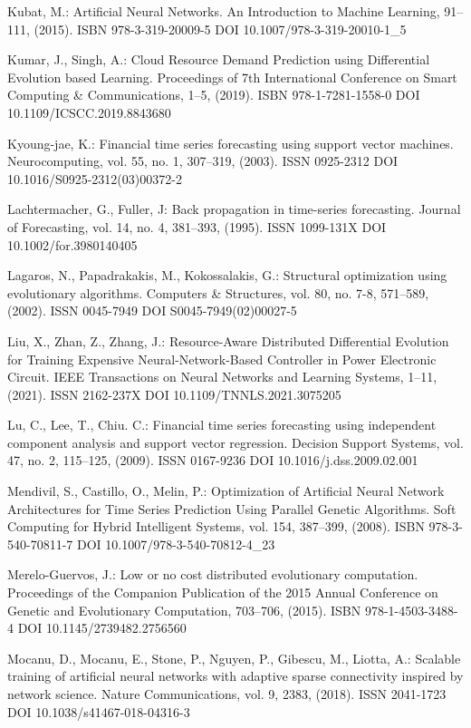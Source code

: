 \begin{thebibliography}{99.}
 Kubat, M.: Artificial Neural Networks. An Introduction to Machine Learning, 91--111, (2015). ISBN 978-3-319-20009-5 DOI 10.1007/978-3-319-20010-1\_5

 Kumar, J., Singh, A.: Cloud Resource Demand Prediction using Differential Evolution based Learning. Proceedings of 7th International Conference on Smart Computing \& Communications, 1--5, (2019). ISBN 978-1-7281-1558-0 DOI 10.1109/ICSCC.2019.8843680

 Kyoung-jae, K.: Financial time series forecasting using support vector machines. Neurocomputing, vol. 55, no. 1, 307--319, (2003). ISSN 0925-2312 DOI 10.1016/S0925-2312(03)00372-2

 Lachtermacher, G., Fuller, J: Back propagation in time-series forecasting. Journal of Forecasting, vol. 14, no. 4, 381--393, (1995). ISSN 1099-131X DOI 10.1002/for.3980140405

 Lagaros, N., Papadrakakis, M., Kokossalakis, G.: Structural optimization using evolutionary algorithms. Computers \& Structures, vol. 80, no. 7-8, 571--589, (2002). ISSN 0045-7949 DOI S0045-7949(02)00027-5

 Liu, X., Zhan, Z., Zhang, J.: Resource-Aware Distributed Differential Evolution for Training Expensive Neural-Network-Based Controller in Power Electronic Circuit. IEEE Transactions on Neural Networks and Learning Systems, 1--11, (2021). ISSN 2162-237X DOI 10.1109/TNNLS.2021.3075205

 Lu, C., Lee, T., Chiu. C.: Financial time series forecasting using independent component analysis and support vector regression. Decision Support Systems, vol. 47, no. 2, 115--125, (2009). ISSN 0167-9236 DOI 10.1016/j.dss.2009.02.001

 Mendivil, S., Castillo, O., Melin, P.: Optimization of Artificial Neural Network Architectures for Time Series Prediction Using Parallel Genetic Algorithms. Soft Computing for Hybrid Intelligent Systems, vol. 154, 387--399, (2008). ISBN 978-3-540-70811-7 DOI 10.1007/978-3-540-70812-4\_23

 Merelo-Guervos, J.: Low or no cost distributed evolutionary computation. Proceedings of the Companion Publication of the 2015 Annual Conference on Genetic and Evolutionary Computation, 703--706, (2015). ISBN 978-1-4503-3488-4 DOI 10.1145/2739482.2756560

 Mocanu, D., Mocanu, E., Stone, P., Nguyen, P., Gibescu, M., Liotta, A.: Scalable training of artificial neural networks with adaptive sparse connectivity inspired by network science. Nature Communications, vol. 9, 2383, (2018). ISSN 2041-1723 DOI 10.1038/s41467-018-04316-3


\end{thebibliography}

